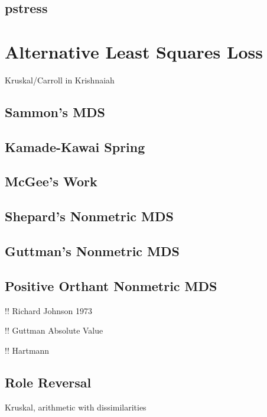 \documentclass[
  12pt,
]{book}
\begin{document}
\section{pstress}\label{pstress}

\chapter{Alternative Least Squares Loss}\label{alternative-least-squares-loss}

Kruskal/Carroll in Krishnaiah

\section{Sammon's MDS}\label{sammons-mds}

\section{Kamade-Kawai Spring}\label{kamade-kawai-spring}

\section{McGee's Work}\label{mcgees-work}

\section{Shepard's Nonmetric MDS}\label{shepards-nonmetric-mds}

\section{Guttman's Nonmetric MDS}\label{guttmans-nonmetric-mds}

\section{Positive Orthant Nonmetric MDS}\label{positive-orthant-nonmetric-mds}

!! Richard Johnson 1973

!! Guttman Absolute Value

!! Hartmann

\section{Role Reversal}\label{interrole}

Kruskal, arithmetic with dissimilarities
\end{document}
